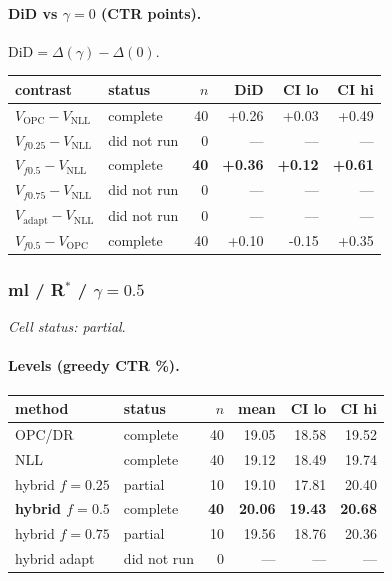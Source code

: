 \documentclass[10pt,a4paper]{article}
\begin{document}
\paragraph{DiD vs $\gamma=0$ (CTR points).} $\mathrm{DiD}=\Delta(\gamma)-\Delta(0)$.
{\centering\small\begin{tabular}{llrrrr}
\toprule contrast & status & $n$ & DiD & CI lo & CI hi \\
\midrule
$V_{\mathrm{OPC}}-V_{\mathrm{NLL}}$ & complete & 40 & +0.26 & +0.03 & +0.49 \\
$V_{f0.25}-V_{\mathrm{NLL}}$ & did not run & 0 & --- & --- & --- \\
\textbf{$V_{f0.5}-V_{\mathrm{NLL}}$} & complete & \textbf{40} & \textbf{+0.36} & \textbf{+0.12} & \textbf{+0.61} \\
$V_{f0.75}-V_{\mathrm{NLL}}$ & did not run & 0 & --- & --- & --- \\
$V_{\mathrm{adapt}}-V_{\mathrm{NLL}}$ & did not run & 0 & --- & --- & --- \\
$V_{f0.5}-V_{\mathrm{OPC}}$ & complete & 40 & +0.10 & -0.15 & +0.35 \\
\bottomrule\end{tabular}\par}
\bigskip
\subsubsection{ml / R$^*$ / $\gamma=0.5$}
\emph{Cell status: partial}.
\paragraph{Levels (greedy CTR \%).}
{\centering\small\begin{tabular}{llrrrr}
\toprule method & status & $n$ & mean & CI lo & CI hi \\
\midrule
OPC/DR & complete & 40 & 19.05 & 18.58 & 19.52 \\
NLL & complete & 40 & 19.12 & 18.49 & 19.74 \\
hybrid $f{=}0.25$ & partial & 10 & 19.10 & 17.81 & 20.40 \\
\textbf{hybrid $f{=}0.5$} & complete & \textbf{40} & \textbf{20.06} & \textbf{19.43} & \textbf{20.68} \\
hybrid $f{=}0.75$ & partial & 10 & 19.56 & 18.76 & 20.36 \\
hybrid adapt & did not run & 0 & --- & --- & --- \\
\bottomrule\end{tabular}\par}
\end{document}
